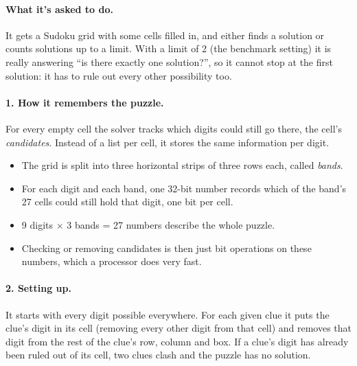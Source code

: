 \documentclass[11pt]{article}
\begin{document}
\paragraph{What it's asked to do.} It gets a Sudoku grid with some cells filled in, and either finds a solution or
counts solutions up to a limit. With a limit of 2 (the benchmark setting) it is really answering ``is there exactly
one solution?'', so it cannot stop at the first solution: it has to rule out every other possibility too.

\paragraph{1. How it remembers the puzzle.} For every empty cell the solver tracks which digits could still go there,
the cell's \emph{candidates}. Instead of a list per cell, it stores the same information per digit.
\begin{itemize}
\item The grid is split into three horizontal strips of three rows each, called \emph{bands}.
\item For each digit and each band, one 32-bit number records which of the band's 27 cells could still hold that
  digit, one bit per cell.
\item 9 digits $\times$ 3 bands = 27 numbers describe the whole puzzle.
\item Checking or removing candidates is then just bit operations on these numbers, which a processor does very fast.
\end{itemize}

\paragraph{2. Setting up.} It starts with every digit possible everywhere. For each given clue it puts the clue's digit
in its cell (removing every other digit from that cell) and removes that digit from the rest of the clue's row, column
and box. If a clue's digit has already been ruled out of its cell, two clues clash and the puzzle has no solution.
\end{document}
